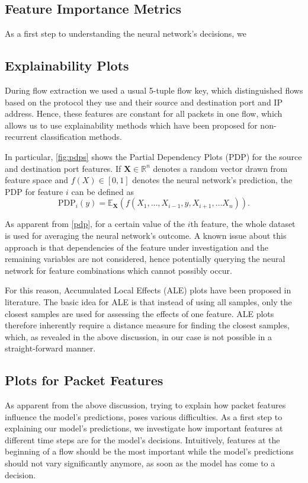 \documentclass[sigconf,nonacm]{acmart}
\begin{document}
\subsection{Feature Importance Metrics}
As a first step to understanding the neural network's decisions, we 
\subsection{Explainability Plots}
During flow extraction we used a usual 5-tuple flow key, which distinguished flows based on the protocol they use and their source and destination port and IP address. Hence, these features are constant for all packets in one flow, which allows us to use explainability methods which have been proposed for non-recurrent classification methods.

In particular,  \autoref{fig:pdps} shows the Partial Dependency Plots (PDP) for the source and destination port features. If $\boldsymbol X \in \mathbb R ^n$ denotes a random vector drawn from feature space and $f(X) \in [0,1]$ denotes the neural network's prediction, the PDP for feature $i$ can be defined as 
\begin{equation} \label{eq:pdp}
\text{PDP}_i(y) = \mathbb E_{\boldsymbol X}\left(f(X_1,\ldots,X_{i-1},y,X_{i+1},\ldots X_n)\right) . %
\end{equation}

As apparent from \autoref{pdp}, for a certain value of the $i$th feature, the whole dataset is used for averaging the neural network's outcome. A known issue about this approach is that dependencies of the feature under investigation and the remaining variables are not considered, hence potentially querying the neural network for feature combinations which cannot possibly occur. 

For this reason, Accumulated Local Effects (ALE) plots have been proposed in literature. The basic idea for ALE is that instead of using all samples, only the closest samples are used for assessing the effects of one feature. ALE plots therefore inherently require a distance measure for finding the closest samples, which, as revealed in the above discussion, in our case is not possible in a straight-forward manner.

\subsection{Plots for Packet Features}
As apparent from the above discussion, trying to explain how packet features influence the model's predictions, poses various difficulties. As a first step to explaining our model's predictions, we investigate how important features at different time steps are for the model's decisions. Intuitively, features at the beginning of a flow should be the most important while the model's predictions should not vary significantly anymore, as soon as the model has come to a decision. 
\end{document}
